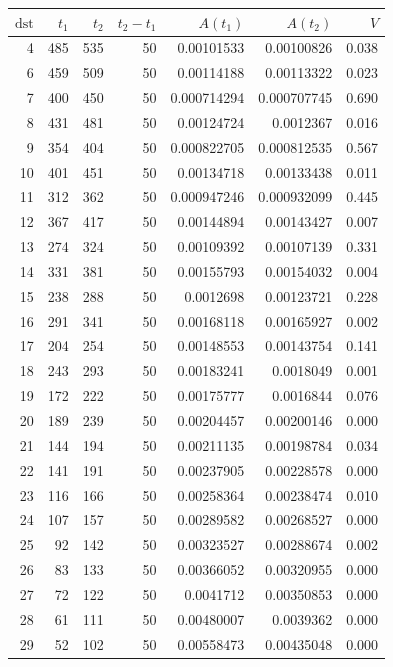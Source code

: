 \begin{tabular}{r r r r r r r}
\toprule
$\mathrm{dst}$ & $t_1$ & $t_2$ & $t_2-t_1$ & $A(t_1)$ & $A(t_2)$ & $V$ \\
\midrule
4 & 485 & 535 & 50 & 0.00101533 & 0.00100826 & 0.038 \\
6 & 459 & 509 & 50 & 0.00114188 & 0.00113322 & 0.023 \\
7 & 400 & 450 & 50 & 0.000714294 & 0.000707745 & 0.690 \\
8 & 431 & 481 & 50 & 0.00124724 & 0.0012367 & 0.016 \\
9 & 354 & 404 & 50 & 0.000822705 & 0.000812535 & 0.567 \\
10 & 401 & 451 & 50 & 0.00134718 & 0.00133438 & 0.011 \\
11 & 312 & 362 & 50 & 0.000947246 & 0.000932099 & 0.445 \\
12 & 367 & 417 & 50 & 0.00144894 & 0.00143427 & 0.007 \\
13 & 274 & 324 & 50 & 0.00109392 & 0.00107139 & 0.331 \\
14 & 331 & 381 & 50 & 0.00155793 & 0.00154032 & 0.004 \\
15 & 238 & 288 & 50 & 0.0012698 & 0.00123721 & 0.228 \\
16 & 291 & 341 & 50 & 0.00168118 & 0.00165927 & 0.002 \\
17 & 204 & 254 & 50 & 0.00148553 & 0.00143754 & 0.141 \\
18 & 243 & 293 & 50 & 0.00183241 & 0.0018049 & 0.001 \\
19 & 172 & 222 & 50 & 0.00175777 & 0.0016844 & 0.076 \\
20 & 189 & 239 & 50 & 0.00204457 & 0.00200146 & 0.000 \\
21 & 144 & 194 & 50 & 0.00211135 & 0.00198784 & 0.034 \\
22 & 141 & 191 & 50 & 0.00237905 & 0.00228578 & 0.000 \\
23 & 116 & 166 & 50 & 0.00258364 & 0.00238474 & 0.010 \\
24 & 107 & 157 & 50 & 0.00289582 & 0.00268527 & 0.000 \\
25 & 92 & 142 & 50 & 0.00323527 & 0.00288674 & 0.002 \\
26 & 83 & 133 & 50 & 0.00366052 & 0.00320955 & 0.000 \\
27 & 72 & 122 & 50 & 0.0041712 & 0.00350853 & 0.000 \\
28 & 61 & 111 & 50 & 0.00480007 & 0.0039362 & 0.000 \\
29 & 52 & 102 & 50 & 0.00558473 & 0.00435048 & 0.000 \\

\end{tabular}
